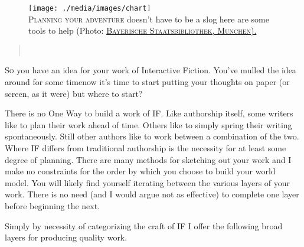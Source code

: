\begin{figure}[h]                                                           
 \texttt{[image: ./media/images/chart]}%
  \small{\textsc{\\ Planning your adventure} doesn't have to be a slog\textemdash
    here are some tools to help (Photo:
    \href{https://en.wikipedia.org/wiki/File:Pedro_Reinel_1504.jpg}{\textsc{Bayerische Staatsbibliothek, Munchen).}}}
  \label{fig:planning}%
\end{figure}                                                                
\begin{quotation} 
\noindent{}\\[2mm]
   \hfill{}
\end{quotation} 

\lettrine[lines=3]{\color{BrickRed}S}{\enspace o} you have an idea for your work of Interactive Fiction. You've mulled the idea
around for some time\textemdash now it's time to start putting your thoughts on
paper (or screen, as it were) but where to start?

There is no One Way to build a work of IF. Like authorship itself, some writers
like to plan their work ahead of time. Others like to simply spring their writing
spontaneously. Still other authors like to work between a combination of the two.
Where IF differs from traditional authorship is the necessity for at least some
degree of planning. There are many methods for sketching out your work and I
make no constraints for the order by which you choose to build your world model.
You will likely find yourself iterating between the various layers of your work.
There is no need (and I would argue not as effective) to complete one layer
before beginning the next.

Simply by necessity of categorizing the craft of IF I offer the following broad
layers for producing quality work.

